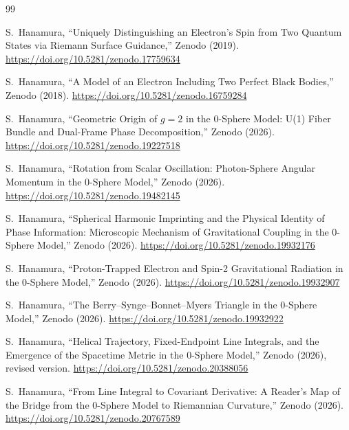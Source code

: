 \documentclass[%
 reprint, amsmath,amssymb, aps, prb, ]{revtex4-2}
\numberwithin{equation}{section}
\begin{document}
\begin{thebibliography}{99}

S.~Hanamura,
``Uniquely Distinguishing an Electron's Spin from Two Quantum States via Riemann Surface Guidance,''
Zenodo (2019).
\href{https://doi.org/10.5281/zenodo.17759634}{https://doi.org/10.5281/zenodo.17759634}

S.~Hanamura,
``A Model of an Electron Including Two Perfect Black Bodies,''
Zenodo (2018).
\href{https://doi.org/10.5281/zenodo.16759284}{https://doi.org/10.5281/zenodo.16759284}

S.~Hanamura,
``Geometric Origin of $g=2$ in the 0-Sphere Model: U(1) Fiber Bundle and Dual-Frame Phase Decomposition,''
Zenodo (2026).
\href{https://doi.org/10.5281/zenodo.19227518}{https://doi.org/10.5281/zenodo.19227518}

S.~Hanamura,
``Rotation from Scalar Oscillation: Photon-Sphere Angular Momentum in the 0-Sphere Model,''
Zenodo (2026).
\href{https://doi.org/10.5281/zenodo.19482145}{https://doi.org/10.5281/zenodo.19482145}

S.~Hanamura,
``Spherical Harmonic Imprinting and the Physical Identity of Phase Information: Microscopic Mechanism of Gravitational Coupling in the 0-Sphere Model,''
Zenodo (2026).
\href{https://doi.org/10.5281/zenodo.19932176}{https://doi.org/10.5281/zenodo.19932176}

S.~Hanamura,
``Proton-Trapped Electron and Spin-2 Gravitational Radiation in the 0-Sphere Model,''
Zenodo (2026).
\href{https://doi.org/10.5281/zenodo.19932907}{https://doi.org/10.5281/zenodo.19932907}

S.~Hanamura,
``The Berry--Synge--Bonnet--Myers Triangle in the 0-Sphere Model,''
Zenodo (2026).
\href{https://doi.org/10.5281/zenodo.19932922}{https://doi.org/10.5281/zenodo.19932922}

S.~Hanamura,
``Helical Trajectory, Fixed-Endpoint Line Integrals, and the Emergence of the Spacetime Metric in the 0-Sphere Model,''
Zenodo (2026), revised version.
\href{https://doi.org/10.5281/zenodo.20388056}{https://doi.org/10.5281/zenodo.20388056}

S.~Hanamura,
``From Line Integral to Covariant Derivative: A Reader's Map of the Bridge from the 0-Sphere Model to Riemannian Curvature,''
Zenodo (2026).
\href{https://doi.org/10.5281/zenodo.20767589}{https://doi.org/10.5281/zenodo.20767589}


\end{thebibliography}
\end{document}
